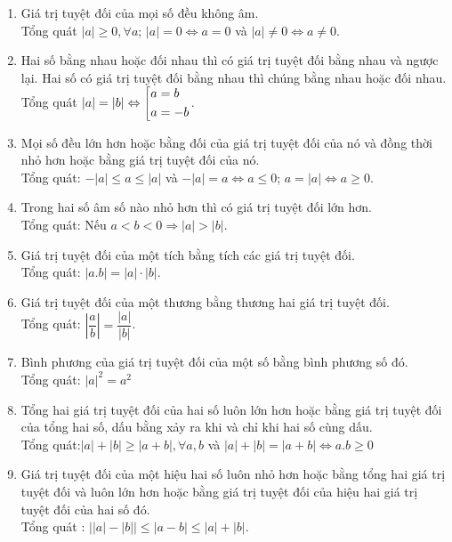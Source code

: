 \begin{tc}\hfill
    \begin{enumerate}
	        \item Giá trị tuyệt đối của mọi số đều không âm.\\ Tổng quát $|a|\geq 0,\forall a$; $|a|=0\Leftrightarrow a=0$ và $|a|\neq 0\Leftrightarrow a\neq 0$.
		\item Hai số bằng nhau hoặc đối nhau thì có giá trị tuyệt đối bằng nhau và ngược lại. Hai số có giá trị tuyệt đối bằng nhau thì chúng bằng nhau hoặc đối nhau.\\
		Tổng quát $|a|=|b|\Leftrightarrow \left[\begin{aligned}&a=b\\&a=-b\end{aligned}\right.$.
		\item Mọi số đều lớn hơn hoặc bằng đối của giá trị tuyệt đối của nó và đồng thời nhỏ hơn hoặc bằng giá trị tuyệt đối của nó.\\
		Tổng quát:	$-\left| a\right|\le a\le \left| a\right|$ và $-\left| a\right|=a\Leftrightarrow a\le 0$; $a=\left| a\right|\Leftrightarrow a\ge 0$.
		\item Trong hai số âm số nào nhỏ hơn thì có giá trị tuyệt đối lớn hơn.\\
		Tổng quát:	Nếu $a<b<0\Rightarrow |a|>|b|$.
		\item Giá trị tuyệt đối của một tích bằng tích các giá trị tuyệt đối.\\
		Tổng quát: $|a.b|=|a|\cdot |b|$.
		\item Giá trị tuyệt đối của một thương bằng thương hai giá trị tuyệt đối.\\
		Tổng quát: $\left|\dfrac{a}{b}\right|=\dfrac{|a|}{|b|}$.
		\item Bình phương của giá trị tuyệt đối của một số bằng bình phương số đó.\\
		Tổng quát: $|a|^2=a^2$
		\item Tổng hai giá trị tuyệt đối của hai số luôn lớn hơn hoặc bằng giá trị tuyệt đối của tổng hai số, dấu bằng xảy ra khi và chỉ khi hai số cùng dấu.\\
		Tổng quát:$|a|+|b|\geq |a+b|,\forall a,b$ và  $|a|+|b|= |a+b|\Leftrightarrow a.b\geq 0$
		\item Giá trị tuyệt đối của một hiệu hai số luôn nhỏ hơn hoặc bằng tổng hai giá trị tuyệt đối và luôn lớn hơn hoặc bằng giá trị tuyệt đối của hiệu hai giá trị tuyệt đối của hai số đó.\\
		Tổng quát : $\left||a|-|b|\right|\leq \left|a-b\right|\leq |a|+|b|$.
	\end{enumerate}
\end{tc}
